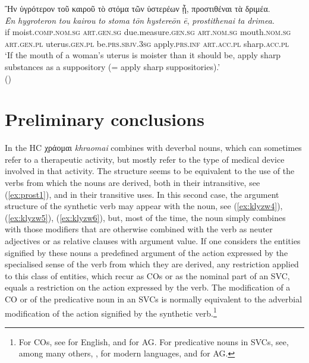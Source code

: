 \documentclass[output=paper,colorlinks,citecolor=brown]{langscibook}
\begin{document}
\begin{exe}
\ex\label{ex:prost6}
\glll Ἢν ὑγρότερον τοῦ καιροῦ τὸ στόμα τῶν ὑστερέων ᾖ, προστιθέναι τὰ δριμέα. \\ 
\textit{Ēn} \textit{hygroteron} \textit{tou} \textit{kairou} \textit{to} \textit{stoma} \textit{tōn} \textit{hystereōn} \textit{ē}, \textit{prostithenai} \textit{ta} \textit{drimea}.\\
if moist.\textsc{comp.nom.sg} \textsc{art.gen.sg} due.measure.\textsc{gen.sg} \textsc{art.nom.sg} mouth.\textsc{nom.sg} \textsc{art.gen.pl} uterus.\textsc{gen.pl} be.\textsc{prs.sbjv.3sg} apply.\textsc{prs.inf} \textsc{art.acc.pl} sharp.\textsc{acc.pl} \\
\glt ‘If the mouth of a woman’s uterus is moister than it should be, apply sharp substances as a suppository (= apply sharp suppositories).' \\
\hspace*{\fill}()
\end{exe}

\section{Preliminary conclusions}
In the HC χράομαι \textit{khraomai} combines with deverbal nouns, which can sometimes refer to a therapeutic activity, but mostly refer to the type of medical device involved in that activity. The structure seems to be equivalent to the use of the verbs from which the nouns are derived, both in their intransitive, see (\ref{ex:prost1}), and in their transitive uses. In this second case, the argument structure of the synthetic verb may appear with the noun, see (\ref{ex:klyzw4}), (\ref{ex:klyzw5}), (\ref{ex:klyzw6}), but, most of the time, the noun simply combines with those modifiers that are otherwise combined with the verb as neuter adjectives or as relative clauses with argument value. If one considers the entities signified by these nouns a predefined argument of the action expressed by the specialised sense of the verb from which they are derived,  any restriction applied to this class of entities, which recur as COs or as the nominal part of an SVC, equals a restriction on the action expressed by the verb. The modification of a CO or of the predicative noun in an SVCs is normally equivalent to the adverbial modification of the action signified by the synthetic verb.\footnote{For COs, see \citet[305]{HuddlestonPullum2002} for English, \citet[287]{horrocksstavrou2010} and \citet[103]{Bruno2011} for AG. For predicative nouns in SVCs, see, among many others, \citet[181--182]{langer2004linguistic}, for modern languages, \citet[156]{Marini2010} and \citet[197--198]{JiménezLópez2016} for AG.}
\end{document}
